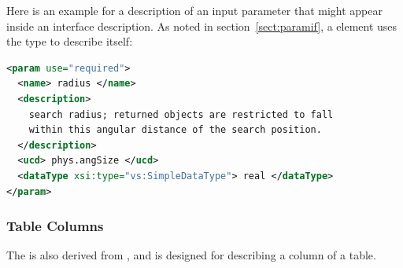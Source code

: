 \documentclass[11pt,a4paper]{ivoa}
\begin{document}


Here is an example for a description
of an input parameter that might appear inside an
 interface description.  As noted in
section~\ref{sect:paramif}, a 
element uses the  type to describe itself:

\begin{lstlisting}[language=XML]
<param use="required">
  <name> radius </name>
  <description>
    search radius; returned objects are restricted to fall
    within this angular distance of the search position.
  </description>
  <ucd> phys.angSize </ucd>
  <dataType xsi:type="vs:SimpleDataType"> real </dataType>
</param>
\end{lstlisting}

\subsubsection{Table Columns}
\label{sect:columns}


The  is also derived from
, and is designed for describing a column of
a table.
\end{document}
